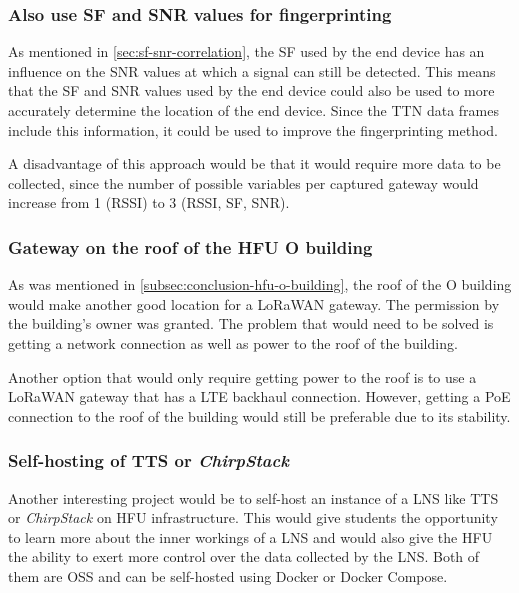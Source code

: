 \subsubsection{Also use \ac{SF} and \ac{SNR} values for fingerprinting}

As mentioned in \cref{sec:sf-snr-correlation}, the \ac{SF} used by the end device has an influence on the \ac{SNR} values at which a signal can still be detected.
This means that the \ac{SF} and \ac{SNR} values used by the end device could also be used to more accurately determine the location of the end device.
Since the \ac{TTN} data frames include this information, it could be used to improve the fingerprinting method.

A disadvantage of this approach would be that it would require more data to be collected, since the number of possible variables per captured gateway would increase from 1 (\ac{RSSI}) to 3 (\ac{RSSI}, \ac{SF}, \ac{SNR}).

\subsubsection{Gateway on the roof of the \acs{HFU} O building}

As was mentioned in \cref{subsec:conclusion-hfu-o-building}, the roof of the O building would make another good location for a \ac{LoRaWAN} gateway.
The permission by the building's owner was granted.
The problem that would need to be solved is getting a network connection as well as power to the roof of the building.

Another option that would only require getting power to the roof is to use a \ac{LoRaWAN} gateway that has a \ac{LTE} backhaul connection.
However, getting a \ac{PoE} connection to the roof of the building would still be preferable due to its stability.

\subsubsection{Self-hosting of \acs{TTS} or \emph{ChirpStack}}

Another interesting project would be to self-host an instance of a \ac{LNS} like \ac{TTS} or \emph{ChirpStack} on \ac{HFU} infrastructure.
This would give students the opportunity to learn more about the inner workings of a \ac{LNS} and would also give the \ac{HFU} the ability to exert more control over the data collected by the \ac{LNS}.
Both of them are \ac{OSS} and can be self-hosted using Docker or Docker Compose.

